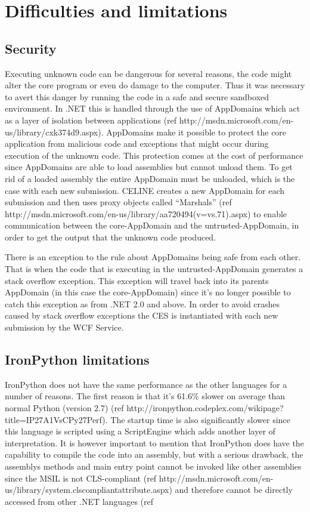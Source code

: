 \section{Difficulties and limitations}

\subsection{Security}
Executing unknown code can be dangerous for several reasons, the code might alter the core program or even do damage to the computer. Thus it was necessary to avert this danger by running the code in a safe and secure sandboxed environment. In .NET this is handled through the use of AppDomains which act as a layer of isolation between applications (ref http://msdn.microsoft.com/en-us/library/cxk374d9.aspx). AppDomains make it possible to protect the core application from malicious code and exceptions that might occur during execution of the unknown code. This protection comes at the cost of performance since AppDomains are able to load assemblies but cannot unload them. To get rid of a loaded assembly the entire AppDomain must be unloaded, which is the case with each new submission. CELINE creates a new AppDomain for each submission and then uses proxy objects called ``Marshals'' (ref http://msdn.microsoft.com/en-us/library/aa720494(v=vs.71).aspx) to enable communication between the core-AppDomain and the untrusted-AppDomain, in order to get the output that the unknown code produced.

There is an exception to the rule about AppDomains being safe from each other. That is when the code that is executing in the untrusted-AppDomain generates a stack overflow exception. This exception will travel back into its parents AppDomain (in this case the core-AppDomain) since it's no longer possible to catch this exception as from .NET 2.0 and above. In order to avoid crashes caused by stack overflow exceptions the CES is instantiated with each new submission by the WCF Service.


\subsection{IronPython limitations} \label{subsec:ironpython_limitations}
IronPython does not have the same performance as the other languages for a number of reasons. The first reason is that it's 61.6\% slower on average than normal Python (version 2.7) (ref http://ironpython.codeplex.com/wikipage?title=IP27A1VsCPy27Perf). The startup time is also significantly slower since this language is scripted using a ScriptEngine which adds another layer of interpretation. It is however important to mention that IronPython does have the capability to compile the code into an assembly, but with a serious drawback, the assemblys methods and main entry point cannot be invoked like other assemblies since the MSIL is not CLS-compliant (ref http://msdn.microsoft.com/en-us/library/system.clscompliantattribute.aspx) and therefore cannot be directly accessed from other .NET languages \cite{Nobody06} (ref %



